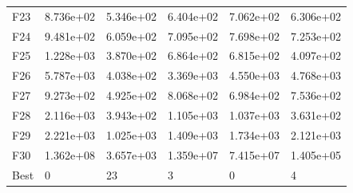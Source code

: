 \begin{tabular}{llllll}
F23  &  8.736e+02 &  5.346e+02 &  6.404e+02 &  7.062e+02 &  6.306e+02 \\
F24  &  9.481e+02 &  6.059e+02 &  7.095e+02 &  7.698e+02 &  7.253e+02 \\
F25  &  1.228e+03 &  3.870e+02 &  6.864e+02 &  6.815e+02 &  4.097e+02 \\
F26  &  5.787e+03 &  4.038e+02 &  3.369e+03 &  4.550e+03 &  4.768e+03 \\
F27  &  9.273e+02 &  4.925e+02 &  8.068e+02 &  6.984e+02 &  7.536e+02 \\
F28  &  2.116e+03 &  3.943e+02 &  1.105e+03 &  1.037e+03 &  3.631e+02 \\
F29  &  2.221e+03 &  1.025e+03 &  1.409e+03 &  1.734e+03 &  2.121e+03 \\
F30  &  1.362e+08 &  3.657e+03 &  1.359e+07 &  7.415e+07 &  1.405e+05 \\
Best &          0 &         23 &          3 &          0 &          4 \\
\bottomrule
\end{tabular}
